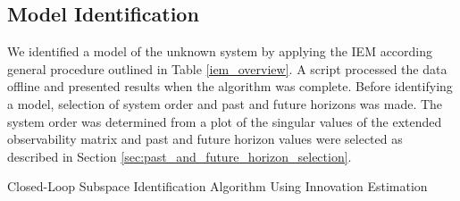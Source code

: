 \subsection{Model Identification}
We identified a model of the unknown system by applying the IEM according general procedure outlined in Table \ref{iem_overview}. A \matlab script processed the data offline and presented results when the algorithm was complete. Before identifying a model, selection of system order and past and future horizons was made. The system order was determined from a plot of the singular values of the extended observability matrix and past and future horizon values were selected as described in Section \ref{sec:past_and_future_horizon_selection}.

\begin{table}[!htb]
\centering
\caption{Closed-Loop Subspace Identification Algorithm Using Innovation Estimation}%
\end{table}
